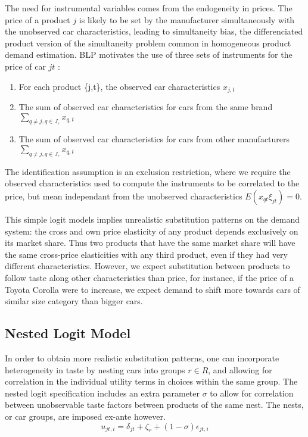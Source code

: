 \documentclass{article}\usepackage[]{graphicx}\usepackage[]{color}
\begin{document}
The  need for instrumental variables comes from the endogeneity in prices. The price of a product $j$ is likely to be set by the manufacturer simultaneously with the unobserved car characteristics, leading to simultaneity bias, the differenciated product version of the simultaneity problem common in homogeneous product demand estimation. BLP motivates the use of three sets of instruments for the price of car $jt$ : 
\begin{enumerate}
  \item For each product \{j,t\}, the observed car characteristics $x_{j,t}$
  \item The sum of observed car characteristics for cars from the same brand $\sum_{q \ne j, q \in J_r} x_{q,t}$
  \item The sum of observed car characteristics for cars from other manufacturers $\sum_{q \ne j, q \in J_r} x_{q,t}$
\end{enumerate}
The identification assumption is an exclusion restriction, where we require the observed characteristics used to compute the instruments to be correlated to the price, but mean independant from the unobserved characteristics $E(x_{qt} \xi_{jt}) = 0$. 

This simple logit models implies unrealistic substitution patterns on the demand system: the cross and own price elasticity of any product depends exclusively on its market share. Thus two products that have the same market share will have the same cross-price elasticities with any third product, even if they had very different characteristics. However, we expect substitution between products to follow taste along other characteristics than price, for instance, if the price of a Toyota Corolla were to increase, we expect demand to shift more towards cars of similar size category than bigger cars.

\subsection{Nested Logit Model}
In order to obtain more realistic substitution patterns, one can incorporate heterogeneity in taste by nesting cars into groups $r \in R$, and allowing for correlation in the individual utility terms in  
choices within the same group. The nested logit specification includes an extra parameter $\sigma$ to allow for correlation between unobservable taste factors between products of the same nest. The nests, or car groups, are imposed ex-ante however.
\begin{equation}
u_{jt,i} = \delta_{jt} + \zeta_r + (1-\sigma) \epsilon_{jt,i}
\label{eq:nested_logit_utility}
\end{equation}
\end{document}
